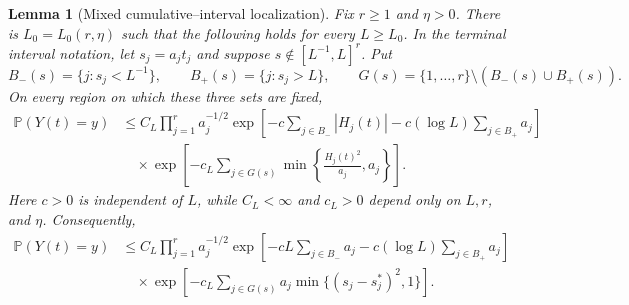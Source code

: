 \documentclass[11pt]{article}
\newtheorem{lemma}[theorem]{Lemma}
\theoremstyle{remark}
\newcommand{\Pp}{\mathbb P}
\begin{document}
\begin{lemma}[Mixed cumulative--interval localization]
\label{lem:projected-cumulative-tail-localization}
Fix $r\ge1$ and $\eta>0$.  There is $L_0=L_0(r,\eta)$ such that the
following holds for every $L\ge L_0$.  In the terminal interval notation, let
$s_j=a_jt_j$ and suppose $s\notin[L^{-1},L]^r$.  Put
\[
        B_-(s)=\{j:s_j<L^{-1}\},\qquad
        B_+(s)=\{j:s_j>L\},\qquad
        G(s)=\{1,\ldots,r\}\setminus(B_-(s)\cup B_+(s)).
\]
On every region on which these three sets are fixed,
\[
\begin{aligned}
        \Pp(Y(t)=y)
        &\le C_L\prod_{j=1}^r a_j^{-1/2}
        \exp\left[-c\sum_{j\in B_-}|H_j(t)|
                   -c(\log L)\sum_{j\in B_+}a_j\right]\\
        &\quad\times
        \exp\left[-c_L\sum_{j\in G(s)}
        \min\left\{\frac{H_j(t)^2}{a_j},a_j\right\}\right].
\end{aligned}\tag{7.3}
\]
Here $c>0$ is independent of $L$, while $C_L<\infty$ and $c_L>0$
depend only on $L,r$, and $\eta$.  Consequently,
\[
\begin{aligned}
        \Pp(Y(t)=y)
        &\le C_L\prod_{j=1}^r a_j^{-1/2}
        \exp\left[-cL\sum_{j\in B_-}a_j
                   -c(\log L)\sum_{j\in B_+}a_j\right]\\
        &\quad\times
        \exp\left[-c_L\sum_{j\in G(s)}
        a_j\min\{(s_j-s_j^*)^2,1\}\right].
\end{aligned}\tag{7.4}
\]
\end{lemma}
\end{document}

